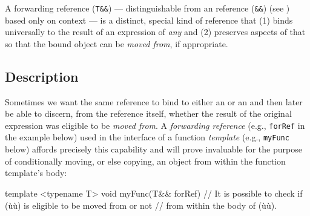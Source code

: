 

\setcounter{table}{0}
\setcounter{footnote}{0}
\setcounter{lstlisting}{0}

A forwarding reference (\lstinline!T&&!) --- distinguishable from an
 reference (\lstinline!&&!) (see )
based only on context
--- is a distinct, special kind of reference that (1) binds
universally to the result of an expression of \emph{any}  and (2) preserves aspects of that  so
that the bound object can be \emph{moved from}, if appropriate.

\subsection[Description]{Description}\label{description-forwardingref}

Sometimes we want the same reference to bind to either an
 or an  and then later be able to discern,
from the reference itself, whether the result of the original expression
was eligible to be \emph{moved from}. A \emph{forwarding reference}
(e.g., \lstinline!forRef! in the example below) used in the interface of a function
\emph{template} (e.g., \lstinline!myFunc! below) affords precisely this
capability and will prove invaluable for the purpose of conditionally
moving, or else copying, an object from within the function template's
body:

\begin{emcppslisting}
template <typename T>
void myFunc(T&& forRef)
{
    // It is possible to check if (ù{}ù) is eligible to be moved from or not
    // from within the body of (ù{}ù).
}
\end{emcppslisting}

